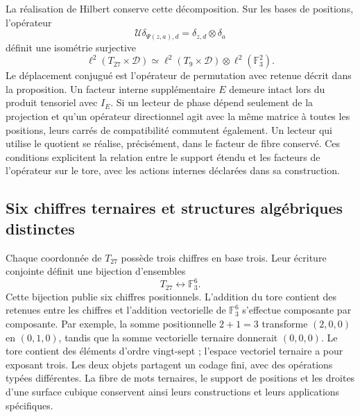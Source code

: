 La réalisation de Hilbert conserve cette décomposition. Sur les bases
de positions, l'opérateur
\[
 \mathcal U\delta_{\Psi(z,a),d}
       =\delta_{z,d}\otimes\delta_a
\]
définit une isométrie surjective
\[
 \ell^2(T_{27}\times\mathcal D)
 \simeq\ell^2(T_9\times\mathcal D)\otimes\ell^2(\mathbb F_3^2).
\]
Le déplacement conjugué est l'opérateur de permutation avec retenue
décrit dans la proposition. Un facteur interne supplémentaire $E$ demeure
intact lors du produit tensoriel avec $I_E$. Si un lecteur de phase dépend seulement de
la projection et qu'un opérateur directionnel agit avec la même matrice à
toutes les positions, leurs carrés de compatibilité
commutent également. Un lecteur qui utilise le quotient se réalise, précisément,
dans le facteur de fibre conservé. Ces conditions explicitent la
relation entre le support étendu et les facteurs de l'opérateur sur
le tore, avec les actions internes déclarées dans sa construction.

\subsection{Six chiffres ternaires et structures algébriques distinctes}

Chaque coordonnée de $T_{27}$ possède trois chiffres en base trois. Leur écriture
conjointe définit une bijection d'ensembles
\[
 T_{27}\longleftrightarrow\mathbb F_3^6.
\]
Cette bijection publie six chiffres positionnels. L'addition du tore
contient des retenues entre les chiffres et l'addition vectorielle de
$\mathbb F_3^6$ s'effectue composante par composante. Par exemple, la
somme positionnelle $2+1=3$ transforme $(2,0,0)$ en $(0,1,0)$, tandis
que la somme vectorielle ternaire donnerait $(0,0,0)$. Le tore contient
des éléments d'ordre vingt-sept ; l'espace vectoriel ternaire a pour
exposant trois. Les deux objets partagent un codage fini,
avec des opérations typées différentes. La fibre de mots ternaires,
le support de positions et les droites d'une surface cubique
conservent ainsi leurs constructions et leurs applications spécifiques.
